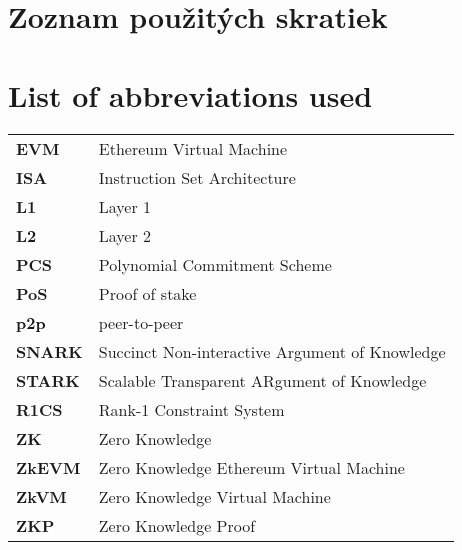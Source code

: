\thispagestyle{plain}

\ifx\FIITlagEN\undefined
    \section*{\Huge Zoznam použitých skratiek}
\else
    \section*{\Huge List of abbreviations used}
\fi
\vskip 1cm

\begin{tabular}{ >{\bfseries}m{2cm} m{10cm} }
	EVM & Ethereum Virtual Machine 							\\
	ISA & Instruction Set Architecture 						\\
	L1 	& Layer 1 											\\
	L2 	& Layer 2 											\\
	PCS & Polynomial Commitment Scheme 						\\
	PoS & Proof of stake 									\\
	p2p & peer-to-peer 										\\
	SNARK & Succinct Non-interactive Argument of Knowledge 	\\
	STARK & Scalable Transparent ARgument of Knowledge 		\\
	R1CS & Rank-1 Constraint System 						\\
	ZK  & Zero Knowledge           							\\
	ZkEVM  & Zero Knowledge Ethereum Virtual Machine   		\\
	ZkVM  & Zero Knowledge Virtual Machine   				\\
	ZKP & Zero Knowledge Proof
\end{tabular}

\emptypage
